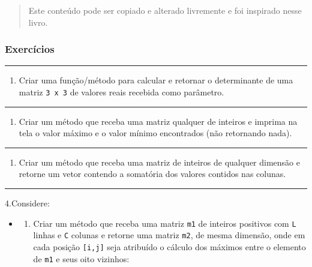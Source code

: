 \documentclass[12pt,a4paper]{article}
\providecommand{\tightlist}{%
      \setlength{\itemsep}{0pt}\setlength{\parskip}{0pt}}
\begin{document}
\begin{quote}
Este conteúdo pode ser copiado e alterado livremente e foi inspirado
nesse livro.
\end{quote}

    \hypertarget{exercuxedcios}{%
\subsubsection{Exercícios}\label{exercuxedcios}}

    \begin{center}\rule{0.5\linewidth}{0.5pt}\end{center}

\begin{enumerate}
\def\labelenumi{\arabic{enumi}.}
\tightlist
\item
  Criar uma função/método para calcular e retornar o determinante de uma
  matriz \texttt{3\ x\ 3} de valores reais recebida como parâmetro.
\end{enumerate}

    \begin{center}\rule{0.5\linewidth}{0.5pt}\end{center}

\begin{enumerate}
\def\labelenumi{\arabic{enumi}.}
\setcounter{enumi}{1}
\tightlist
\item
  Criar um método que receba uma matriz qualquer de inteiros e imprima
  na tela o valor máximo e o valor mínimo encontrados (não retornando
  nada).
\end{enumerate}

    \begin{center}\rule{0.5\linewidth}{0.5pt}\end{center}

\begin{enumerate}
\def\labelenumi{\arabic{enumi}.}
\setcounter{enumi}{2}
\tightlist
\item
  Criar um método que receba uma matriz de inteiros de qualquer dimensão
  e retorne um vetor contendo a somatória dos valores contidos nas
  colunas.
\end{enumerate}

    \begin{center}\rule{0.5\linewidth}{0.5pt}\end{center}

4.Considere:

\begin{itemize}
\item
  \begin{enumerate}
  \def\labelenumi{\alph{enumi})}
  \tightlist
  \item
    Criar um método que receba uma matriz \texttt{m1} de inteiros
    positivos com \texttt{L} linhas e \texttt{C} colunas e retorne uma
    matriz \texttt{m2}, de mesma dimensão, onde em cada posição
    \texttt{{[}i,j{]}} seja atribuído o cálculo dos máximos entre o
    elemento de \texttt{m1} e seus oito vizinhos:
  \end{enumerate}
\end{itemize}
\end{document}
